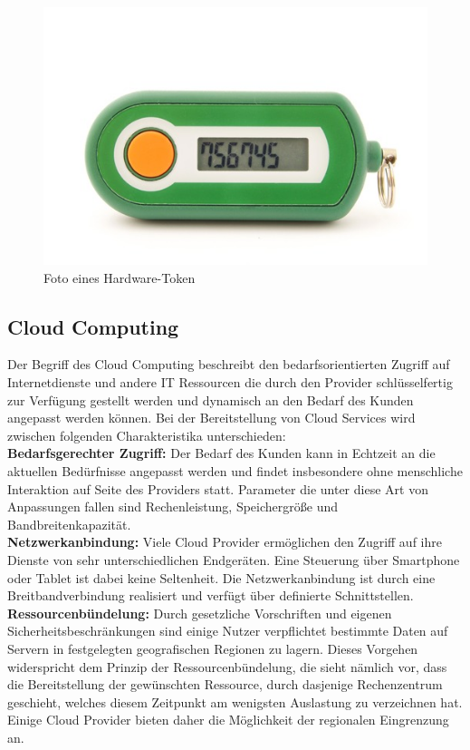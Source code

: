 \documentclass[
book,
a4paper,   
titlepage,  
halfparskip,
12pt        
]{scrartcl}
\begin{document}
\begin{onehalfspacing}
\begin{figure}[h]
	\centering
	\includegraphics[width=0.5\linewidth]{token.jpg}
	\caption[Token]{Foto eines Hardware-Token\cite{token}}
	\label{fig:token}
\end{figure}

\subsection{Cloud Computing}
\label{subsec:cloud}
Der Begriff des Cloud Computing beschreibt den bedarfsorientierten Zugriff auf Internetdienste und andere \ac{IT} Ressourcen die durch den Provider schlüsselfertig zur Verfügung gestellt werden und dynamisch an den Bedarf des Kunden angepasst werden können. Bei der Bereitstellung von Cloud Services wird zwischen folgenden Charakteristika unterschieden\cite[S. 8]{cloudsec}:\\
\textbf{Bedarfsgerechter Zugriff:} Der Bedarf des Kunden kann in Echtzeit an die aktuellen Bedürfnisse angepasst werden und findet insbesondere ohne menschliche Interaktion auf Seite des Providers statt. Parameter die unter diese Art von Anpassungen fallen sind Rechenleistung, Speichergröße und Bandbreitenkapazität.\cite[S. 8]{cloudsec}\\
\textbf{Netzwerkanbindung:}  Viele Cloud Provider ermöglichen den Zugriff auf ihre Dienste von sehr unterschiedlichen Endgeräten. Eine Steuerung über Smartphone oder Tablet ist dabei keine Seltenheit. Die Netzwerkanbindung ist durch eine Breitbandverbindung realisiert und verfügt über definierte Schnittstellen.\cite[S. 8]{cloudsec}\\
\textbf{Ressourcenbündelung:} Durch gesetzliche Vorschriften und eigenen Sicherheitsbeschränkungen sind einige Nutzer verpflichtet bestimmte Daten auf Servern in festgelegten geografischen Regionen zu lagern. Dieses Vorgehen widerspricht dem Prinzip der Ressourcenbündelung, die sieht nämlich vor, dass die Bereitstellung der gewünschten Ressource, durch dasjenige Rechenzentrum geschieht, welches diesem Zeitpunkt am wenigsten Auslastung zu verzeichnen hat. Einige Cloud Provider bieten daher die Möglichkeit der regionalen Eingrenzung an.\cite[S. 8]{cloudsec}\\

\end{onehalfspacing}
\end{document}
